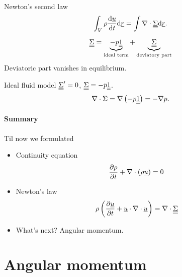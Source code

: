\documentclass[../main.tex]{subfiles}
\begin{document}
    Newton's second law
    \begin{displaymath}
      \int_V \rho \frac{\mathrm{d} \underline{u}}{\mathrm{d} t} \mathrm{d} \underline{r} = \int\nabla \cdot \underline{\underline{{\Sigma}}} \mathrm{d} \underline{r}.
    \end{displaymath}

    \begin{displaymath}
      \underline{\underline{{\Sigma}}} = \underbrace{- p \underline{\underline{1}}}_{\textrm{ideal term}} + \underbrace{\underline{\underline{\Sigma}}}_{\textrm{deviatory part}}
    \end{displaymath}
    Deviatoric part vanishes in equilibrium.

    Ideal fluid model $\underline{\underline{{\Sigma}}}' = 0$, $\underline{\underline{{\Sigma}}} = - p \underline{\underline{1}}$.
    \begin{displaymath}
      \nabla \cdot \Sigma = \nabla \left( - p \underline{\underline{1}} \right) = - \nabla p.
    \end{displaymath}

    \paragraph{Summary}
    Til now we formulated
    
    \begin{itemize}
      \item Continuity equation
        \begin{displaymath}
            \frac{\partial \rho}{\partial t} + \nabla \cdot ( \rho \underline{u} ) = 0
        \end{displaymath}
      \item Newton's law
        \begin{displaymath}
          \rho \left( \frac{\partial \underline{u} }{\partial t} + \underline{u} \cdot \nabla \cdot \underline{u}  \right) = \nabla \cdot \underline{\underline{{\Sigma}}}
      \end{displaymath}
    \item What's next? Angular momentum.
    \end{itemize}

    \section{Angular momentum}
    \begin{figure}[h]
      \centering
    \end{figure}
\end{document}
